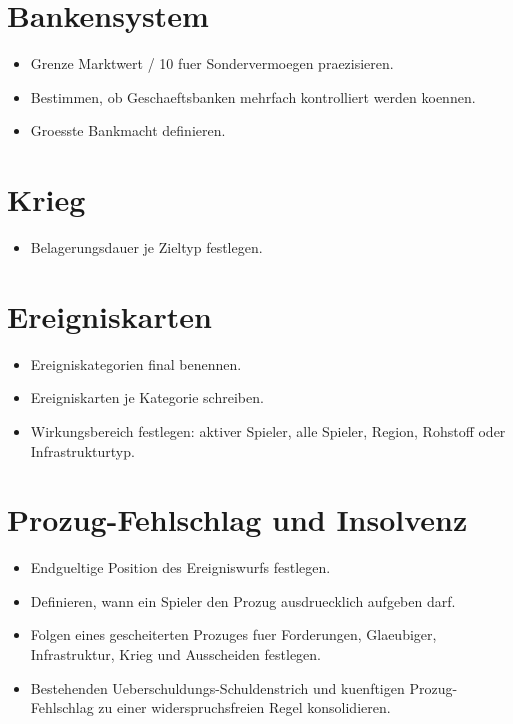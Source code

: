 \documentclass[11pt,a4paper,oneside,parskip=half]{scrreprt}
\begin{document}
\section{Bankensystem}
\begin{itemize}
  \item Grenze Marktwert / 10 fuer Sondervermoegen praezisieren.
  \item Bestimmen, ob Geschaeftsbanken mehrfach kontrolliert werden koennen.
  \item Groesste Bankmacht definieren.
\end{itemize}

\section{Krieg}
\begin{itemize}
  \item Belagerungsdauer je Zieltyp festlegen.
\end{itemize}

\section{Ereigniskarten}
\begin{itemize}
  \item Ereigniskategorien final benennen.
  \item Ereigniskarten je Kategorie schreiben.
  \item Wirkungsbereich festlegen: aktiver Spieler, alle Spieler, Region, Rohstoff oder Infrastrukturtyp.
\end{itemize}

\section{Prozug-Fehlschlag und Insolvenz}
\begin{itemize}
  \item Endgueltige Position des Ereigniswurfs festlegen.
  \item Definieren, wann ein Spieler den Prozug ausdruecklich aufgeben darf.
  \item Folgen eines gescheiterten Prozuges fuer Forderungen, Glaeubiger, Infrastruktur, Krieg und Ausscheiden festlegen.
  \item Bestehenden Ueberschuldungs-Schuldenstrich und kuenftigen Prozug-Fehlschlag zu einer widerspruchsfreien Regel konsolidieren.
\end{itemize}
\end{document}
